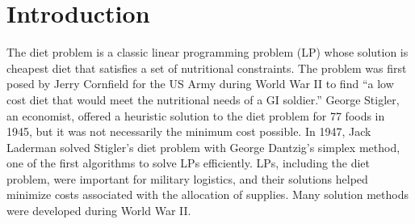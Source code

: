 %
%
%
%
%




\doublespacing
\maketitle
\tableofcontents

\begin{abstract}
\thispagestyle{plain}
\setcounter{page}{2}

\noindent
The concentration of an unknown  solution was determined to be 60 $\pm$ 2 mM using linear sweep voltammetry. Cyclic voltammetry was used to determine an experimental reduction potential of 0.813 V for the / half-reaction, which had an error of 5.4\% from the literature value of 0.771 V.

\end{abstract}

\section{Introduction}

The diet problem is a classic linear programming problem (LP) whose solution is
cheapest diet that satisfies a set of nutritional constraints. The problem was
first posed by Jerry Cornfield for the US Army during World War
II\cite{vanDooren} to find ``a low cost diet that would meet the nutritional
needs of a GI soldier.''\cite{Dantzig} George Stigler, an economist, offered a
heuristic solution to the diet problem for 77 foods in 1945, but it was not
necessarily the minimum cost possible.\cite{Stigler, Dantzig} In 1947, Jack
Laderman solved Stigler's diet problem with George Dantzig's simplex
method,\cite{Dantzig} one of the first algorithms to solve LPs
efficiently. \cite{chongzak} 
LPs, including the diet problem, were important for
military logistics, and their solutions helped minimize costs associated with
the allocation of supplies. Many solution methods were developed during World
War II.\cite{chongzak}

